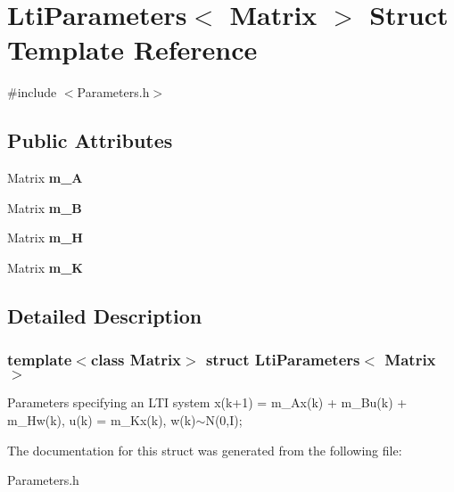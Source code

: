 \hypertarget{structLtiParameters}{}\section{Lti\+Parameters$<$ Matrix $>$ Struct Template Reference}
\label{structLtiParameters}


{\ttfamily \#include $<$Parameters.\+h$>$}

\subsection*{Public Attributes}
\begin{DoxyCompactItemize}
\item 
\mbox{\label{structLtiParameters_a117a4d148ad3068dc22891c537a48ec4}} 
Matrix {\bfseries m\+\_\+A}
\item 
\mbox{\label{structLtiParameters_a14bf1ac0d0c26c93a4167208837df56f}} 
Matrix {\bfseries m\+\_\+B}
\item 
\mbox{\label{structLtiParameters_afd333012f537cc44f0749d77ab4f8197}} 
Matrix {\bfseries m\+\_\+H}
\item 
\mbox{\label{structLtiParameters_a2970c608cf7d6d4a0e0a01a527e357f5}} 
Matrix {\bfseries m\+\_\+K}
\end{DoxyCompactItemize}


\subsection{Detailed Description}
\subsubsection*{template$<$class Matrix$>$\newline
struct Lti\+Parameters$<$ Matrix $>$}

Parameters specifying an L\+TI system x(k+1) = m\+\_\+\+Ax(k) + m\+\_\+\+Bu(k) + m\+\_\+\+Hw(k), u(k) = m\+\_\+\+Kx(k), w(k)$\sim$\+N(0,\+I); 

The documentation for this struct was generated from the following file\+:\begin{DoxyCompactItemize}
\item 
Parameters.\+h\end{DoxyCompactItemize}
